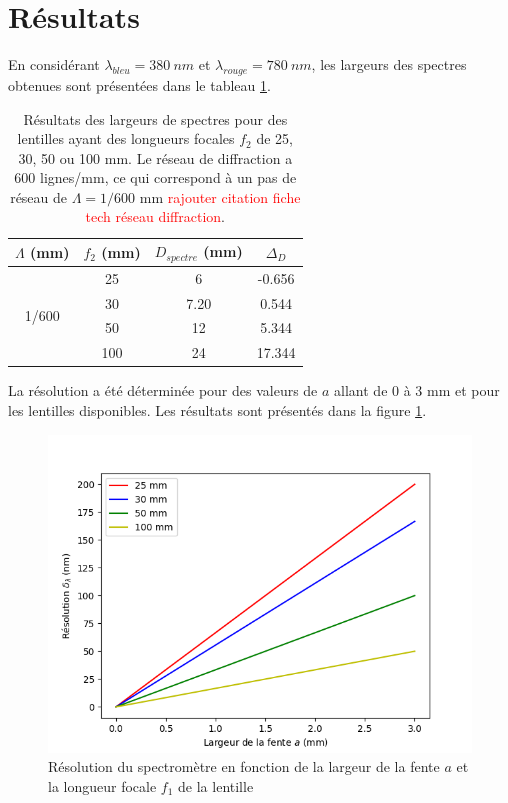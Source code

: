 \documentclass[conference]{IEEEtran}
\begin{document}
\section{Résultats \label{resultats}}
En considérant $\lambda_{bleu}=380\ nm$ et $\lambda_{rouge}=780\ nm$, les largeurs des spectres obtenues sont présentées
dans le tableau \ref{largeur_spectre}.
\begin{table}[H]
    \caption{Résultats des largeurs de spectres pour des lentilles ayant des longueurs focales
    $f_2$ de 25, 30, 50 ou 100 mm. Le réseau de diffraction a 600 lignes/mm, ce qui correspond à un pas de réseau
    de $\Lambda=1/600$ mm \textcolor{red}{rajouter citation fiche tech réseau diffraction}.}    
    \centering
    \begin{tabular}{c|c|c|c}
    $\Lambda$ (mm) & $f_2$ (mm) & $D_{spectre}$ (mm) & $\Delta_D$ \\
    \hline
    \hline
    \multirow{4}{*}{1/600} & 25 & 6 & -0.656 \\
    & 30 & 7.20 & 0.544 \\
    & 50 & 12 & 5.344 \\
    & 100 & 24 & 17.344\\
    \hline
    \end{tabular}
    \label{largeur_spectre}
  \end{table}
La résolution a été déterminée pour des valeurs de $a$ allant de 0 à 3 mm et pour les lentilles
disponibles. Les résultats sont présentés dans la figure \ref{res}.
\begin{figure}[H]
    \centering
    \includegraphics[scale=0.5]{Resolution.png}
    \caption{Résolution du spectromètre en fonction de la largeur de la fente $a$ et la longueur focale $f_1$
    de la lentille}
    \label{res}
\end{figure}
\end{document}
